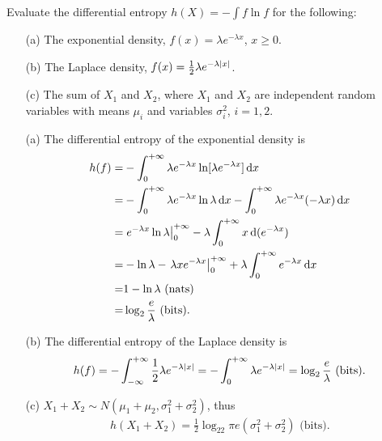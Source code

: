 \documentclass{assignment}
\begin{document}
\begin{prob}
    Evaluate the differential entropy $h(X)=-\int f\ln f$ for the following:
    \begin{itemize}
        \item[(a)] The exponential density, $f(x)=\lambda e^{-\lambda x}$, $x\geq 0$.
        \item[(b)] The Laplace density, $f(x)=\frac{1}{2}\lambda e^{-\lambda\left\lvert x\right\rvert}$.
        \item[(c)] The sum of $X_1$ and $X_2$, where $X_1$ and $X_2$ are independent random variables with means $\mu_i$ and variables $\sigma_i^2$, $i=1,2$.
    \end{itemize}
\end{prob}
\begin{sol}
    \begin{itemize}
        \item[(a)] The differential entropy of the exponential density is
        \begin{align}
            \notag h(f)=&-\int_0^{+\infty}\lambda e^{-\lambda x}\ln[\lambda e^{-\lambda x}]\,\mathrm{d}x\\
            \notag=&-\int_0^{+\infty}\lambda e^{-\lambda x}\ln\lambda\,\mathrm{d}x-\int_0^{+\infty}\lambda e^{-\lambda x}(-\lambda x)\,\mathrm{d}x\\
            \notag=&\left.e^{-\lambda x}\ln\lambda\right\rvert_0^{+\infty}-\lambda\int_0^{+\infty}x\,\mathrm{d}(e^{-\lambda x})\\
            \notag=&-\ln\lambda-\left.\lambda xe^{-\lambda x}\right\rvert_0^{+\infty}+\lambda\int_0^{+\infty}e^{-\lambda x}\,\mathrm{d}x\\
            \notag=&1-\ln\lambda\text{ (nats)}\\
            =&\log_2\frac{e}{\lambda}\text{ (bits)}.
        \end{align}
        \item[(b)] The differential entropy of the Laplace density is
        \begin{align}
            h(f)=-\int_{-\infty}^{+\infty}\frac{1}{2}\lambda e^{-\lambda\left\lvert x\right\rvert}=-\int_0^{+\infty}\lambda e^{-\lambda\left\lvert x\right\rvert}=\log_2\frac{e}{\lambda}\text{ (bits)}.
        \end{align}
        \item[(c)] $X_1+X_2\sim N(\mu_1+\mu_2,\sigma_1^2+\sigma_2^2)$, thus
        \begin{align}
            h(X_1+X_2)=\frac{1}{2}\log_22\pi e(\sigma_1^2+\sigma_2^2)\text{ (bits)}.
        \end{align}
    \end{itemize}
\end{sol}
\end{document}
